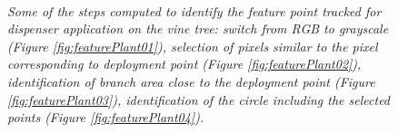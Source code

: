 \begin{figure}
	\centering
	 \\
	\caption{\textit{Some of the steps computed to identify the feature point tracked for dispenser application on the vine tree: switch from RGB to grayscale (Figure \ref{fig:featurePlant01}), selection of pixels similar to the pixel corresponding to deployment point (Figure \ref{fig:featurePlant02}), identification of branch area close to the deployment point (Figure \ref{fig:featurePlant03}), identification of the circle including the selected points (Figure \ref{fig:featurePlant04}).}}
	\label{fig:featurePlant}
\end{figure}
	




